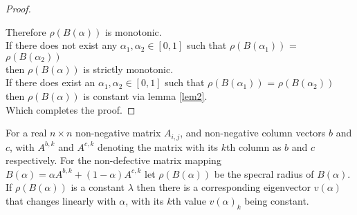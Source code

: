 \begin{proof}
\begin{itemize}
\end{itemize}
Therefore $\rho(B(\alpha))$ is monotonic.\\
If there does not exist any $\alpha_1,\alpha_2\in[0,1]$ such that $\rho(B(\alpha_1))$ = $\rho(B(\alpha_2))$\\
\-\hspace{8mm}then $\rho(B(\alpha))$ is strictly monotonic.\\
If there does exist an $\alpha_1,\alpha_2\in[0,1]$ such that $\rho(B(\alpha_1))$ = $\rho(B(\alpha_2))$\\
\-\hspace{8mm}then $\rho(B(\alpha))$ is constant via lemma \ref{lem2}.\\
Which completes the proof.
\end{proof}


\begin{theorem}\label{th:3}
For a real $n\times n$ non-negative matrix $A_{i,j}$, and non-negative column vectors $b$ and $c$, with $A^{b,k}$ and $A^{c,k}$ denoting the matrix with its $k$th column as $b$ and $c$ respectively. For the non-defective matrix mapping $B(\alpha) = \alpha A^{b,k} + (1-\alpha)A^{c,k}$ let $\rho(B(\alpha))$ be the specral radius of $B(\alpha)$.
If $\rho(B(\alpha))$ is a constant $\lambda$ then there is a corresponding eigenvector $v(\alpha)$ that changes linearly with $\alpha$, with its $k$th value $v(\alpha)_k$ being constant.
\end{theorem}
